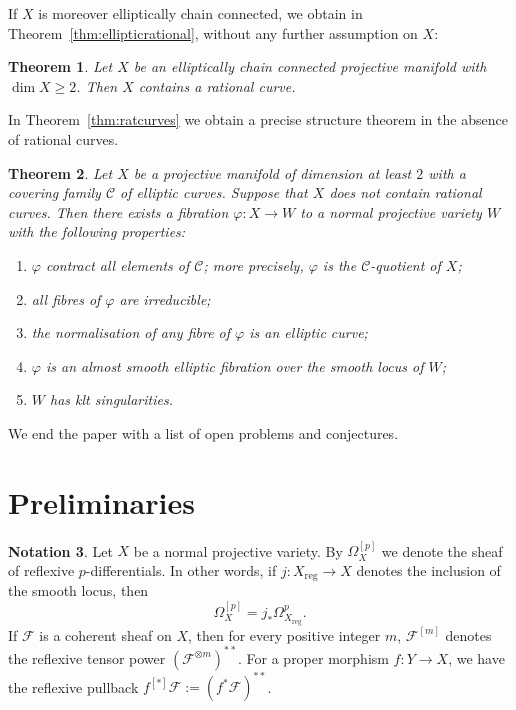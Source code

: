 \documentclass[11pt]{article}
\newtheorem{theo}{Theorem}[section]
\theoremstyle{definition}
\newtheorem{nota}[theo]{Notation}
\numberwithin{equation}{section}
\numberwithin{figure}{section}
\numberwithin{table}{section}
\DeclareMathOperator{\reg}{reg}
\newcommand\sF{\mathcal{F}}
\newcommand\sC{\mathcal{C}}
\newcommand*{\romanenumi}{\renewcommand*{\theenumi}{\roman{enumi}}}
\begin{document}
If $X$ is moreover elliptically chain connected, we obtain in Theorem~\ref{thm:ellipticrational}, without any further assumption on $X$:

\begin{theo}\label{thm:main1.5}
Let $X$ be an elliptically chain connected projective manifold with $\dim X \geq 2$. Then $X$ contains a rational curve.
\end{theo}

In Theorem~\ref{thm:ratcurves} we obtain a precise structure theorem in the absence of rational curves.

\pagebreak
\begin{theo}\label{thm:main1.6}
Let $X$ be a projective manifold of dimension at least $2$ with a covering family $\sC$ of elliptic curves. Suppose that $X$ does not contain rational curves. Then there exists a fibration $\varphi\colon X \to W$ to a normal projective variety $W$ with the following properties:
\begin{enumerate}\romanenumi
\item \label{list-1.6.1}$\varphi$ contract all elements of $\sC$; more precisely, $\varphi$ is the $\sC$-quotient of $X$;
\item \label{list-1.6.2}all fibres of $\varphi$ are irreducible;
\item \label{list-1.6.3}the normalisation of any fibre of $\varphi$ is an elliptic curve;
\item \label{list-1.6.4}$\varphi$ is an almost smooth elliptic fibration over the smooth locus of $W$;
\item \label{list-1.6.5}$W$ has klt singularities.
\end{enumerate}
\end{theo}

We end the paper with a list of open problems and conjectures.


\section{Preliminaries} \label{sec:prelim}

\begin{nota}\label{nota:main2.1}
Let $X$ be a normal projective variety. By $\Omega^{[p]}_X$ we denote the sheaf of reflexive $p$-differentials. In other words, if $j\colon X_{\reg} \to X$ denotes the inclusion of the smooth locus, then
\[
\Omega^{[p]}_X = j_*\Omega^p_{X_{\reg}}.
\]
If $\sF$ is a coherent sheaf on $X$, then for every positive integer $m$, $\sF^{[m]}$ denotes the reflexive tensor power $(\sF^{\otimes m})^{**}$. For a proper morphism $f\colon Y\to X$, we have the reflexive pullback $f^{[*]}\sF:=(f^*\sF)^{**}$.
\end{nota}
\end{document}
